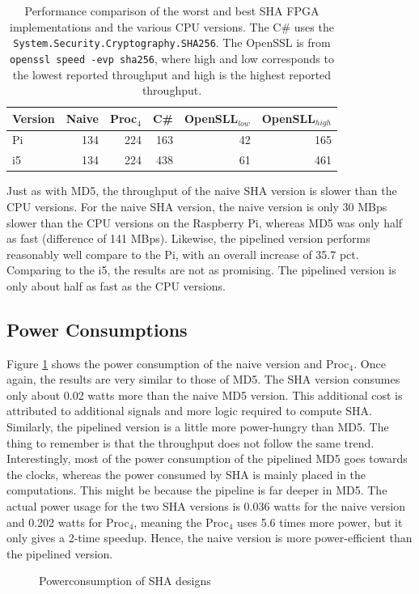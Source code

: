 \documentclass[a4paper, openany]{book}
\begin{document}
\begin{table}[!htb]
\centering
\captionsetup{width=.8\linewidth}
\begin{tabular}{l r r r r r}
\hline
\textbf{Version} & Naive & Proc$_{4}$ & C\# & OpenSLL$_{low}$ & OpenSLL$_{high}$\\
\hline
Pi & 134 & 224 & 163 & 42 & 165\\
i5 & 134 & 224 & 438 & 61 & 461
\end{tabular}
\caption[SHA256: FPGA and CPU comparisons]%
{Performance comparison of the worst and best SHA FPGA implementations and the various CPU versions. The C\# uses the \texttt{System.Security.Cryptography.SHA256}. The OpenSSL is from \texttt{openssl speed -evp sha256}, where high and low corresponds to the lowest reported throughput and high is the highest reported throughput.}
\label{tab:SHAcompare}
\end{table}
Just as with MD5, the throughput of the naive SHA version is slower than the CPU versions. For the naive SHA version, the naive version is only 30 MBps slower than the CPU versions on the Raspberry Pi, whereas MD5 was only half as fast (difference of 141 MBps). Likewise, the pipelined version performs reasonably well compare to the Pi, with an overall increase of 35.7 pct. Comparing to the i5, the results are not as promising. The pipelined version is only about half as fast as the CPU versions.
\subsection{Power Consumptions}
\label{sec:org418f887}
Figure \ref{fig:SHA_power} shows the power consumption of the naive version and Proc\(_4\). Once again, the results are very similar to those of MD5. The SHA version consumes only about 0.02 watts more than the naive MD5 version. This additional cost is attributed to additional signals and more logic required to compute SHA. Similarly, the pipelined version is a little more power-hungry than MD5. The thing to remember is that the throughput does not follow the same trend.
Interestingly, most of the power consumption of the pipelined MD5 goes towards the clocks, whereas the power consumed by SHA is mainly placed in the computations. This might be because the pipeline is far deeper in MD5. The actual power usage for the two SHA versions is 0.036 watts for the naive version and 0.202 watts for Proc\(_4\), meaning the Proc\(_4\) uses 5.6 times more power, but it only gives a 2-time speedup. Hence, the naive version is more power-efficient than the pipelined version.
\begin{figure}[H]
\centering
{}
\caption[Power consumption of SHA256 designs]
{Powerconsumption of SHA designs}
\label{fig:SHA_power}
\end{figure}
\end{document}
